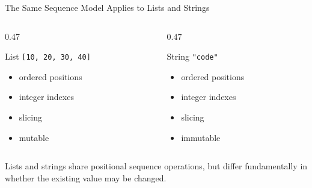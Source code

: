 \documentclass[aspectratio=169,10pt]{beamer}
\begin{document}
\begin{frame}{The Same Sequence Model Applies to Lists and Strings}
  \begin{columns}[T,onlytextwidth]
    \begin{column}{0.47\textwidth}
      \begin{block}{List}
        \centering
        \texttt{[10, 20, 30, 40]}
      \end{block}
      \begin{itemize}
        \item ordered positions
        \item integer indexes
        \item slicing
        \item mutable
      \end{itemize}
    \end{column}
    \begin{column}{0.47\textwidth}
      \begin{block}{String}
        \centering
        \texttt{"code"}
      \end{block}
      \begin{itemize}
        \item ordered positions
        \item integer indexes
        \item slicing
        \item immutable
      \end{itemize}
    \end{column}
  \end{columns}

  \begin{keyidea}
    Lists and strings share positional sequence operations, but differ fundamentally in whether the existing value may be changed.
  \end{keyidea}
\end{frame}
\end{document}
